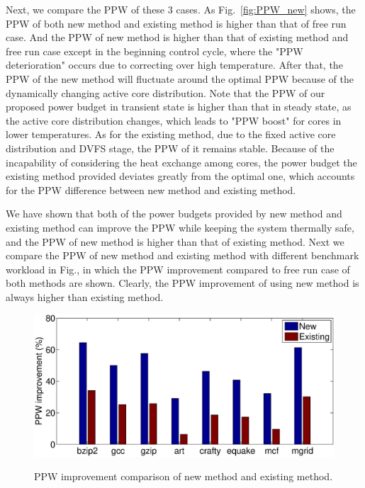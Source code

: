 Next, we compare the PPW of these $3$ cases. As Fig.~\ref{fig:PPW_new} shows, the PPW of both new method and existing method is higher than that of free run case. And the PPW of new method is higher than that of existing method and free run case except in the beginning control cycle, where the "PPW deterioration" occurs due to correcting over high temperature. After that, the PPW of the new method will fluctuate around the optimal PPW because of the dynamically changing active core distribution. Note that the PPW of our proposed power budget in transient state is higher than that in steady state, as the active core distribution changes, which leads to "PPW boost" for cores in lower temperatures. As for the existing method, due to the fixed active core distribution and DVFS stage, the PPW of it remains stable. Because of the incapability of considering the heat exchange among cores, the power budget the existing method provided deviates greatly from the optimal one, which accounts for the PPW difference between new method and existing method. 

We have shown that both of the power budgets provided by new method and existing method can improve the PPW while keeping the system thermally safe, and the PPW of new method is higher than that of existing method. Next we compare the PPW of new method and existing method with different benchmark workload in Fig.\cite{fig:transient_ppw_spec}, in which the PPW improvement compared to free run case of both methods are shown. Clearly, the PPW improvement of using new method is always higher than existing method.

\begin{figure}
\centering
\includegraphics[width=1\linewidth]{fig/transient_ppw.eps}\label{fig:transient_ppw_spec}
\caption{PPW improvement comparison of new method and existing method.}
\end{figure}




